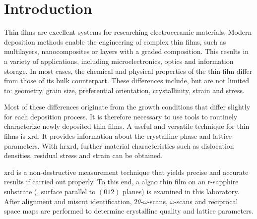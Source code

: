 \section{Introduction}
Thin films are excellent systems for researching electroceramic materials. Modern
deposition methods enable the engineering of complex thin films, such as
multilayers, nanocomposites or layers with a graded composition. This results in
a variety of applications, including microelectronics, optics and information
storage. In most cases, the chemical and physical properties of the thin film
differ from those of its bulk counterpart. These differences include, but are
not limited to: geometry, grain size, preferential orientation, crystallinity, strain
and stress.

Most of these differences originate from the growth conditions that differ slightly
for each deposition process. It is therefore necessary to use tools to routinely
characterize newly deposited thin films. A useful and versatile technique for thin
films is \ac{xrd}. It provides information about the crystalline phase and lattice parameters.
With \ac{hrxrd}, further material characteristics such as dislocation densities,
residual stress and strain can be obtained.

\ac{xrd} is a non-destructive measurement technique that yields precise and
accurate results if carried out properly. To this end, a \ac{algao} thin film on an
r-sapphire substrate (, surface parallel to $(012)$ planes) is examined
in this laboratory. After alignment and miscut identification, $2\theta\text{-}\omega$-scans,
$\omega$-scans and reciprocal space maps are performed to determine crystalline
quality and lattice parameters.